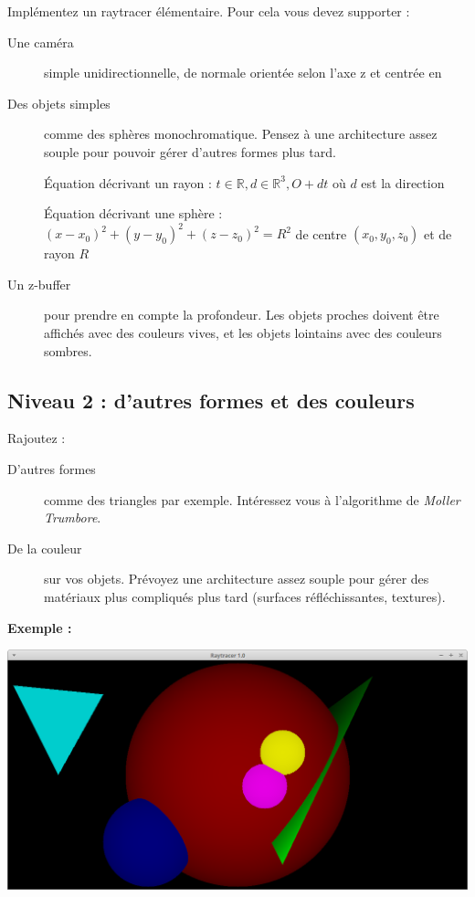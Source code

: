 \documentclass[a4paper, 11pt]{article}
\begin{document}
Implémentez un raytracer élémentaire. Pour cela vous devez supporter :  
  
\begin{description}
\item [Une caméra] simple unidirectionnelle, de normale orientée selon l'axe z et centrée en 
\item [Des objets simples] comme des sphères monochromatique. Pensez à une architecture assez souple pour pouvoir gérer d'autres formes plus tard. 

Équation décrivant un rayon : $ t\in \mathbb{R}, d\in \mathbb{R}^3, O + dt$ où $d$ est la direction
 
Équation décrivant une sphère : $(x - x_0)^2 + (y - y_0)^2 + (z - z_0)^2 = R^2$ de centre $(x_0, y_0, z_0)$ et de rayon $R$
\item [Un z-buffer] pour prendre en compte la profondeur. Les objets proches doivent être affichés avec des couleurs vives, et les objets lointains avec des couleurs sombres. 
  
\end{description}  

\subsection*{Niveau 2 : d'autres formes et des couleurs}

Rajoutez :

\begin{description}
\item [D'autres formes] comme des triangles par exemple. Intéressez vous à l'algorithme de \textit{Moller Trumbore}.  
\item [De la couleur] sur vos objets. Prévoyez une architecture assez souple pour gérer des matériaux plus compliqués plus tard (surfaces réfléchissantes, textures).  
  
\end{description}  

\textbf{Exemple :}
  
\begin{center}
\includegraphics[scale=0.2]{correct1.png} 
\end{center}
\end{document}
